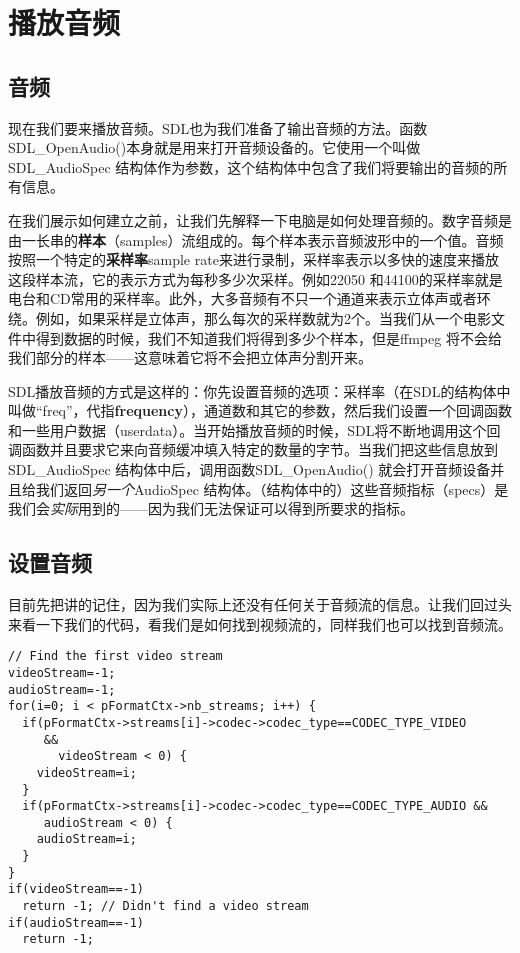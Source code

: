 ﻿\chapter{播放音频}
\label{ch3}
\section{音频}
现在我们要来播放音频。SDL也为我们准备了输出音频的方法。函数SDL_OpenAudio()本身就是用来打开音频设备的。它使用一个叫做SDL_AudioSpec 结构体作为参数，这个结构体中包含了我们将要输出的音频的所有信息。

在我们展示如何建立之前，让我们先解释一下电脑是如何处理音频的。数字音频是由一长串的\textbf{样本}（samples）流组成的。每个样本表示音频波形中的一个值。音频按照一个特定的\textbf{采样率}{sample rate}来进行录制，采样率表示以多快的速度来播放这段样本流，它的表示方式为每秒多少次采样。例如22050 和44100的采样率就是电台和CD常用的采样率。此外，大多音频有不只一个通道来表示立体声或者环绕。例如，如果采样是立体声，那么每次的采样数就为2个。当我们从一个电影文件中得到数据的时候，我们不知道我们将得到多少个样本，但是ffmpeg 将不会给我们部分的样本——这意味着它将不会把立体声分割开来。

SDL播放音频的方式是这样的：你先设置音频的选项：采样率（在SDL的结构体中叫做“freq”，代指\textbf{frequency}），通道数和其它的参数，然后我们设置一个回调函数和一些用户数据（userdata）。当开始播放音频的时候，SDL将不断地调用这个回调函数并且要求它来向音频缓冲填入特定的数量的字节。当我们把这些信息放到SDL_AudioSpec 结构体中后，调用函数SDL_OpenAudio() 就会打开音频设备并且给我们返回\emph{另一个}AudioSpec 结构体。（结构体中的）这些音频指标（specs）是我们会\emph{实际}用到的——因为我们无法保证可以得到所要求的指标。

\section{设置音频}

目前先把讲的记住，因为我们实际上还没有任何关于音频流的信息。让我们回过头来看一下我们的代码，看我们是如何找到视频流的，同样我们也可以找到音频流。

\begin{lstlisting}
// Find the first video stream
videoStream=-1;
audioStream=-1;
for(i=0; i < pFormatCtx->nb_streams; i++) {
  if(pFormatCtx->streams[i]->codec->codec_type==CODEC_TYPE_VIDEO
     &&
       videoStream < 0) {
    videoStream=i;
  }
  if(pFormatCtx->streams[i]->codec->codec_type==CODEC_TYPE_AUDIO &&
     audioStream < 0) {
    audioStream=i;
  }
}
if(videoStream==-1)
  return -1; // Didn't find a video stream
if(audioStream==-1)
  return -1;
\end{lstlisting}

